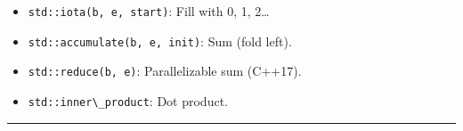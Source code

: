\begin{itemize}
\tightlist
\item
  \passthrough{\lstinline!std::iota(b, e, start)!}: Fill with 0, 1,
  2\ldots{}
\item
  \passthrough{\lstinline!std::accumulate(b, e, init)!}: Sum (fold
  left).
\item
  \passthrough{\lstinline!std::reduce(b, e)!}: Parallelizable sum
  (C++17).
\item
  \passthrough{\lstinline!std::inner\_product!}: Dot product.
\end{itemize}

\begin{center}\rule{0.5\linewidth}{0.5pt}\end{center}
